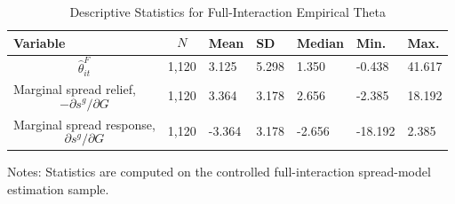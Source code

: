 \begin{table}[H]\centering
\begin{threeparttable}
\caption{Descriptive Statistics for Full-Interaction Empirical Theta}
\label{tab:theta_descriptive_stats}
\scriptsize
\begin{tabularx}{\textwidth}{lYYYYYY}
\toprule
Variable & $$N$$ & Mean & SD & Median & Min. & Max. \\
\midrule
$$\widehat{\theta}^{F}_{it}$$ & 1,120 & 3.125 & 5.298 & 1.350 & -0.438 & 41.617 \\
Marginal spread relief, $$-\partial s^g/\partial G$$ & 1,120 & 3.364 & 3.178 & 2.656 & -2.385 & 18.192 \\
Marginal spread response, $$\partial s^g/\partial G$$ & 1,120 & -3.364 & 3.178 & -2.656 & -18.192 & 2.385 \\
\bottomrule
\end{tabularx}
\begin{tablenotes}[flushleft]\footnotesize
\item Notes: Statistics are computed on the controlled full-interaction spread-model estimation sample.
\end{tablenotes}
\end{threeparttable}
\end{table}
